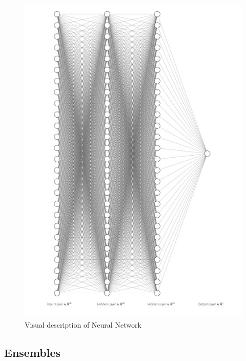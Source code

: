 \documentclass[
]{article}
\begin{document}
\begin{figure}
\centering
\includegraphics{NN_rep.jpeg}
\caption{Visual description of Neural Network}
\end{figure}

\hypertarget{ensembles}{%
\subsection{Ensembles}\label{ensembles}}
\end{document}
